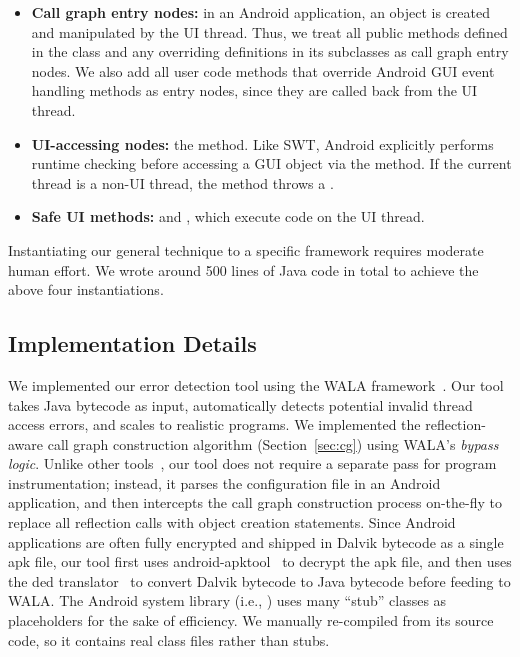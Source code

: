 \begin{myindentpar}{-2mm}
\begin{itemize}
\tinystep

\item \textbf{Call graph entry nodes: }in an Android application,
an  object is created and manipulated by the UI thread. Thus, we treat
all public methods defined in the  class 
and any overriding definitions in its subclasses as call graph entry nodes.
We also add all user code methods that override Android GUI event handling methods
as entry nodes, since they are called back from the UI thread.

\tinystep

\item \textbf{UI-accessing nodes: }the  method.
Like SWT, Android explicitly performs runtime checking before accessing
a GUI object via the  method. If the current
thread is a non-UI thread, the  method throws
a .

\tinystep

\item \textbf{Safe UI methods: } 
and , which execute code on the UI thread. 

\end{itemize}
\end{myindentpar}

\tinystep

Instantiating our general technique to  a specific framework
requires moderate human effort. We wrote around 500 lines of Java code in total to achieve
the above four instantiations.

\subsection{Implementation Details}

We implemented our error detection tool using
the WALA framework~\cite{walatutorial}.
Our tool takes Java bytecode as input, 
automatically detects potential invalid thread access
errors, and scales to realistic programs.  
We implemented the reflection-aware call graph construction
 algorithm (Section~\ref{sec:cg}) using WALA's \textit{bypass logic}.
Unlike other tools~\cite{Payet:2011:SAA:2032266.2032299}, our tool
does not require a separate pass for program instrumentation; instead, it
parses the configuration file in an Android application,
and then intercepts the call graph construction
process on-the-fly to replace all reflection calls with object creation statements.
Since Android applications are often fully encrypted and shipped in Dalvik
bytecode as a single apk file, our tool first uses
android-apktool~\cite{apktool} to
decrypt the apk file, and then uses the 
ded translator~\cite{ded} to convert
Dalvik bytecode to Java bytecode before feeding to WALA.  The Android system
library (i.e., ) uses many ``stub'' classes as
placeholders for the sake of efficiency. We manually re-compiled 
 from its source code, so it contains real
class files rather than stubs.
